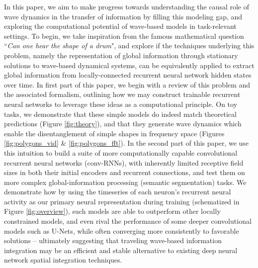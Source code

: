 In this paper, we aim to make progress towards understanding the causal role of wave dynamics in the transfer of information by filling this modeling gap, and exploring the computational potential of wave-based models in task-relevant settings. To begin, we take inspiration from the famous mathematical question ``\emph{Can one hear the shape of a drum}", and explore if the techniques underlying this problem, namely the representation of global information through stationary solutions to wave-based dynamical systems, can be equivalently applied to extract global information from locally-connected recurrent neural network hidden states over time. In first part of this paper, we begin with a review of this problem and the associated formalism, outlining how we may construct trainable recurrent neural networks to leverage these ideas as a computational principle. On toy tasks, we demonstrate that these simple models do indeed match theoretical predictions (Figure \ref{fig:theory}), and that they generate wave dynamics which enable the disentanglement of simple shapes in frequency space (Figures \ref{fig:polygons_vid} \& \ref{fig:polygons_fft}). 
In the second part of this paper, we use this intuition to build a suite of more computationally capable convolutional recurrent neural networks (conv-RNNs), with inherently limited receptive field sizes in both their initial encoders and recurrent connections, and test them on more complex global-information processing (semantic segmentation) tasks. We demonstrate how by using the timeseries of each neuron's recurrent neural activity as our primary neural representation during training (schematized in Figure \ref{fig:overview}), such models are able to outperform other locally constrained models, and even rival the performance of some deeper convolutional models such as U-Nets, while often converging more consistently to favorable solutions -- ultimately suggesting that traveling wave-based information integration may be an efficient and stable alternative to existing deep neural network spatial integration techniques.  